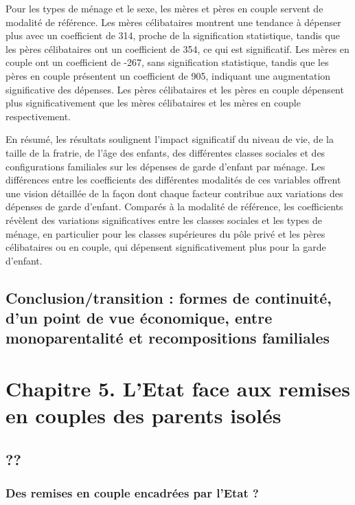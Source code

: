 \documentclass[
  12pt,
]{book}
\begin{document}
Pour les types de ménage et le sexe, les mères et pères en couple
servent de modalité de référence. Les mères célibataires montrent une
tendance à dépenser plus avec un coefficient de 314, proche de la
signification statistique, tandis que les pères célibataires ont un
coefficient de 354, ce qui est significatif. Les mères en couple ont un
coefficient de -267, sans signification statistique, tandis que les
pères en couple présentent un coefficient de 905, indiquant une
augmentation significative des dépenses. Les pères célibataires et les
pères en couple dépensent plus significativement que les mères
célibataires et les mères en couple respectivement.

En résumé, les résultats soulignent l'impact significatif du niveau de
vie, de la taille de la fratrie, de l'âge des enfants, des différentes
classes sociales et des configurations familiales sur les dépenses de
garde d'enfant par ménage. Les différences entre les coefficients des
différentes modalités de ces variables offrent une vision détaillée de
la façon dont chaque facteur contribue aux variations des dépenses de
garde d'enfant. Comparés à la modalité de référence, les coefficients
révèlent des variations significatives entre les classes sociales et les
types de ménage, en particulier pour les classes supérieures du pôle
privé et les pères célibataires ou en couple, qui dépensent
significativement plus pour la garde d'enfant.

\section{Conclusion/transition : formes de continuité, d'un point de vue
économique, entre monoparentalité et recompositions
familiales}\label{conclusiontransition-formes-de-continuituxe9-dun-point-de-vue-uxe9conomique-entre-monoparentalituxe9-et-recompositions-familiales}

\chapter{Chapitre 5. L'Etat face aux remises en couples des parents
isolés}\label{chapitre-5.-letat-face-aux-remises-en-couples-des-parents-isoluxe9s}

\section{??}\label{section}

\subsection{Des remises en couple encadrées par l'Etat
?}\label{des-remises-en-couple-encadruxe9es-par-letat}
\end{document}
